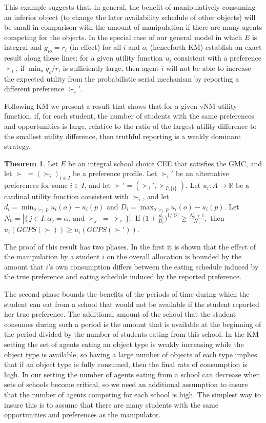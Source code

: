 \documentclass[12pt, A4paper]{article}
\theoremstyle{definition}
\newtheorem{thm}{Theorem}
\renewcommand{\Re}{\mathbb{R}}
\begin{document}
This example suggests that, in general, the benefit of manipulatively consuming an inferior object (to change the later availability schedule of other objects) will be small in comparison with the amount of manipulation if there are many agents competing for the objects. In the special case of our general model in which $E$ is integral and $g_{io} = r_i$ (in effect) for all $i$ and $o$,  \cite{km10jet} (henceforth KM) establish an exact result along these lines: for a given utility function $u_i$ consistent with a preference $\succ_i$, if $\min_o q_o/r_i$ is sufficiently large, then agent $i$ will not be able to increase the expected utility from the probabilistic serial mechanism by reporting a different preference $\succ_i'$.

Following KM we present a result that shows that for a given vNM utility function, if, for each student, the number of students with the same preferences and opportunities is large, relative to the ratio of the largest utility difference to the smallest utility difference, then truthful reporting is a weakly dominant strategy.

\begin{thm} \label{th:StrategyProof}
Let $E$ be an integral school choice CEE that satisfies the GMC, and let $\succ \; = (\succ_i)_{i \in I}$ be a preference profile.  Let $\succ_i'$ be an alternative preferences for some $i \in I$,  and let $\succ' = (\succ_i',\succ_{I \setminus \{i\}})$.  Let $u_i \colon A \to \Re$ be a cardinal utility function consistent with $\succ_i$, and let $d_i = \min_{o \, \succ_i \, p} u_i(o) - u_i(p)$ and $D_i = \max_{o \, \succ_i \, p} u_i(o) - u_i(p).$  Let
$N_0 =  |\{\, j \in I : \text{$\alpha_j = \alpha_i$ and $\succ_j \; = \; \succ_i$} \,\}|$.
If $\big(1 + \frac{d_i}{D_i}\big)^{1/|O|} \ge  \frac{N_0 + 1}{N_0},$ then $u_i(GCPS(\succ)) \ge u_i(GCPS(\succ'))$.
\end{thm}

The proof of this result has two phases.  In the first it is shown that the effect of the manipulation by a student $i$ on the overall allocation is bounded by the amount that $i$'s own consumption differs between the eating schedule induced by the true preference and eating schedule induced by the reported preference.  

The second phase bounds the benefits of the periods of time during which the student can eat from a school that would not be available if the student reported her true preference.  The additional amount of the school that the student consumes during such a period is the amount that is available at the beginning of the period divided by the number of students eating from this school.  In the KM setting the set of agents eating an object type is weakly increasing while the object type is available, so having a large number of objects of each type implies that if an object type is fully consumed, then the final rate of consumption is high.  In our setting the number of agents eating from a school can decrease when sets of schools become critical, so we need an additional assumption to insure that the number of agents competing for each school is high.  The simplest way to insure this is to assume that there are many students with the same opportunities and preferences as the manipulator.
\end{document}
